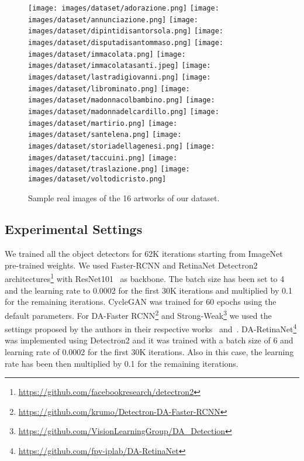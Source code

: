 \documentclass[preprint]{elsarticle}
\begin{document}
\begin{figure*}[t!]
            \vspace{0.4cm}
            \texttt{[image: images/dataset/adorazione.png]}
            \texttt{[image: images/dataset/annunciazione.png]}
            \vspace{0.1cm}
            \texttt{[image: images/dataset/dipintidisantorsola.png]}
            \texttt{[image: images/dataset/disputadisantommaso.png]}
            \texttt{[image: images/dataset/immacolata.png]}
            \texttt{[image: images/dataset/immacolatasanti.jpeg]}
            \texttt{[image: images/dataset/lastradigiovanni.png]}
            \vspace{0.1cm}
            \texttt{[image: images/dataset/librominato.png]}
            \texttt{[image: images/dataset/madonnacolbambino.png]}
            \texttt{[image: images/dataset/madonnadelcardillo.png]}
            \texttt{[image: images/dataset/martirio.png]}
            \texttt{[image: images/dataset/santelena.png]}
            \texttt{[image: images/dataset/storiadellagenesi.png]}
            \texttt{[image: images/dataset/taccuini.png]}
            \texttt{[image: images/dataset/traslazione.png]}
            \texttt{[image: images/dataset/voltodicristo.png]}
            \caption{\label{fig:real}Sample real images of the 16 artworks of our dataset.}
\end{figure*}
\subsection{Experimental Settings}
We trained all the object detectors for 62K iterations starting from ImageNet~\cite{deng2009imagenet} pre-trained weights. We used Faster-RCNN and RetinaNet Detectron2~\cite{wu2019detectron2} architectures\footnote{\url{https://github.com/facebookresearch/detectron2}} with ResNet101~\cite{he2016deep} as backbone. The batch size has been set to 4 and the learning rate to 0.0002 for the first 30K iterations and multiplied by 0.1 for the remaining iterations. CycleGAN was trained for 60 epochs using the default parameters.  For DA-Faster RCNN\footnote{\url{https://github.com/krumo/Detectron-DA-Faster-RCNN}} and Strong-Weak\footnote{\url{https://github.com/VisionLearningGroup/DA_Detection}} we used the settings proposed by the authors in their respective works \cite{chen2018domain}~and~\cite{Saito_2019}. DA-RetinaNet\footnote{\url{https://github.com/fpv-iplab/DA-RetinaNet}} was implemented using Detectron2 and it was trained with a batch size of 6 and learning rate of 0.0002 for the first 30K iterations. Also in this case, the learning rate has been then multiplied by 0.1 for the remaining iterations.
\end{document}
